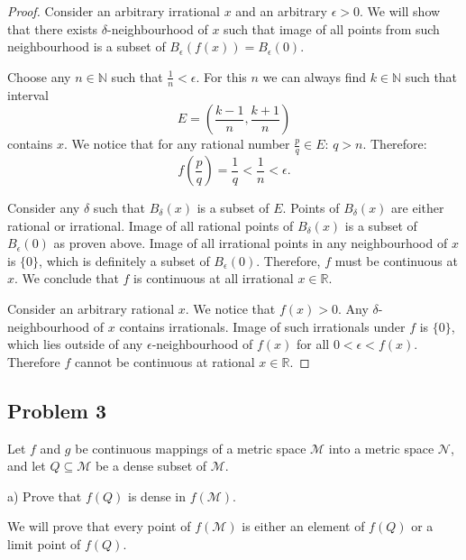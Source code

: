 \documentclass{article}
\newcommand{\R}{\mathbb{R}}
\newcommand{\N}{\mathbb{N}}
\begin{document}
\begin{proof}

Consider an arbitrary irrational $x$ and an arbitrary $\epsilon>0$.
We will show that there exists $\delta$-neighbourhood of $x$ such that image of all points from such neighbourhood is a subset of $B_{\epsilon}(f(x)) = B_{\epsilon}(0)$.

Choose any $n \in \N$ such that $\frac{1}{n} < \epsilon$.
For this $n$ we can always find $k \in \N$ such that interval
\[ E = \left( \frac{k-1}{n}, \frac{k+1}{n} \right) \]
contains $x$.
We notice that for any rational number $\frac{p}{q} \in E$: $q > n $.
Therefore:
\[ f \left( \frac{p}{q} \right) = \frac{1}{q} < \frac{1}{n} < \epsilon. \]

Consider any $\delta$ such that $B_{\delta}(x)$ is a subset of $E$.
Points of $B_{\delta}(x)$ are either rational or irrational.
Image of all rational points of $B_{\delta}(x)$ is a subset of $B_{\epsilon}(0)$ as proven above.
Image of all irrational points in any neighbourhood of $x$ is $\{0\}$, which is definitely a subset of $B_{\epsilon}(0)$.
Therefore, $f$ must be continuous at $x$.
We conclude that $f$ is continuous at all irrational $x \in \R$.

Consider an arbitrary rational $x$.
We notice that $f(x)>0$.
Any $\delta$-neighbourhood of $x$ contains irrationals.
Image of such irrationals under $f$ is $\{0\}$, which lies outside of any $\epsilon$-neighbourhood of $f(x)$ for all $0 < \epsilon < f(x)$.
Therefore $f$ cannot be continuous at rational $x \in \R$.

\end{proof}


\subsection*{Problem 3}

\begin{tcolorbox}
Let $f$ and $g$ be continuous mappings of a metric space $\mathcal{M}$ into a metric space $\mathcal{N}$, and let $Q \subseteq \mathcal{M}$ be a dense subset of $\mathcal{M}$.

a) Prove that $f(Q)$ is dense in $f(\mathcal{M})$.
\end{tcolorbox}

We will prove that every point of $f(\mathcal{M})$ is either an element of $f(Q)$ or a limit point of $f(Q)$.
\end{document}
